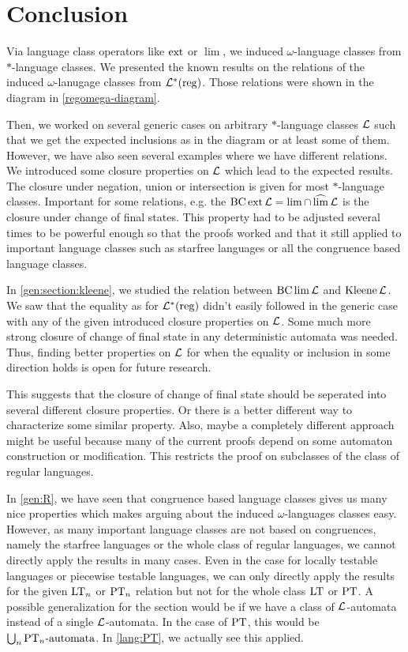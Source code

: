 \section{Conclusion}
\label{chapter:conclusion}

Via language class operators like $\operatorname{ext}$ or $\lim$, we induced $\omega$-language classes from $*$-language classes. We presented the known results on the relations of the induced $\omega$-lanugage classes from $\mathcal{L}^*(\textup{\textrm{reg}})$. Those relations were shown in the diagram in \cref{regomega-diagram}.

Then, we worked on several generic cases on arbitrary $*$-language classes $\mathcal{L}$ such that we get the expected inclusions as in the diagram or at least some of them. However, we have also seen several examples where we have different relations. We introduced some closure properties on $\mathcal{L}$ which lead to the expected results. The closure under negation, union or intersection is given for most $*$-language classes. Important for some relations, e.g. the $\operatorname{BC} \operatorname{ext} \mathcal{L} = \lim \cap \operatorname{\widehat{lim}} \mathcal{L}$ is the closure under change of final states. This property had to be adjusted several times to be powerful enough so that the proofs worked and that it still applied to important language classes such as starfree languages or all the congruence based language classes.

In \cref{gen:section:kleene}, we studied the relation between $\operatorname{BC} \lim \mathcal{L}$ and $\operatorname{Kleene} \mathcal{L}$. We saw that the equality as for $\mathcal{L}^*(\textup{\textrm{reg}})$ didn't easily followed in the generic case with any of the given introduced closure properties on $\mathcal{L}$. Some much more strong closure of change of final state in any deterministic automata was needed. Thus, finding better properties on $\mathcal{L}$ for when the equality or inclusion in some direction holds is open for future research.

This suggests that the closure of change of final state should be seperated into several different closure properties. Or there is a better different way to characterize some similar property. Also, maybe a completely different approach might be useful because many of the current proofs depend on some automaton construction or modification. This restricts the proof on subclasses of the class of regular languages.

In \cref{gen:R}, we have seen that congruence based language classes gives us many nice properties which makes arguing about the induced $\omega$-languages classes easy. However, as many important language classes are not based on congruences, namely the starfree languages or the whole class of regular languages, we cannot directly apply the results in many cases. Even in the case for locally testable languages or piecewise testable languages, we can only directly apply the results for the given $\textup{\textrm{LT}}_n$ or $\textup{\textrm{PT}}_n$ relation but not for the whole class $\textup{\textrm{LT}}$ or $\textup{\textrm{PT}}$. A possible generalization for the section would be if we have a class of $\mathcal{L}$-automata instead of a single $\mathcal{L}$-automata. In the case of $\textup{\textrm{PT}}$, this would be $\bigcup_n \text{$\textup{\textrm{PT}}_n$-automata}$. In \cref{lang:PT}, we actually see this applied.

